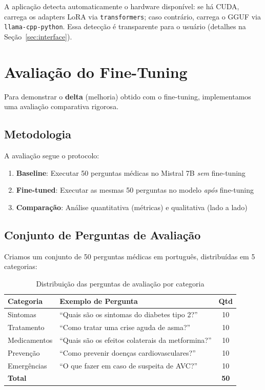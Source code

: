 A aplicação detecta automaticamente o hardware disponível: se há CUDA, carrega os adapters LoRA via \texttt{transformers}; caso contrário, carrega o GGUF via \texttt{llama-cpp-python}. Essa detecção é transparente para o usuário (detalhes na Seção~\ref{sec:interface}).

\section{Avaliação do Fine-Tuning}
\label{sec:avaliacao-ft}

Para demonstrar o \textbf{delta} (melhoria) obtido com o fine-tuning, implementamos uma avaliação comparativa rigorosa.

\subsection{Metodologia}

A avaliação segue o protocolo:

\begin{enumerate}
    \item \textbf{Baseline}: Executar 50 perguntas médicas no Mistral 7B \textit{sem} fine-tuning
    \item \textbf{Fine-tuned}: Executar as mesmas 50 perguntas no modelo \textit{após} fine-tuning
    \item \textbf{Comparação}: Análise quantitativa (métricas) e qualitativa (lado a lado)
\end{enumerate}

\subsection{Conjunto de Perguntas de Avaliação}

Criamos um conjunto de 50 perguntas médicas em português, distribuídas em 5 categorias:

\begin{table}[H]
\centering
\caption{Distribuição das perguntas de avaliação por categoria}
\label{tab:perguntas-avaliacao}
\begin{tabular}{llc}
\toprule
\textbf{Categoria} & \textbf{Exemplo de Pergunta} & \textbf{Qtd} \\
\midrule
Sintomas & ``Quais são os sintomas do diabetes tipo 2?'' & 10 \\
Tratamento & ``Como tratar uma crise aguda de asma?'' & 10 \\
Medicamentos & ``Quais são os efeitos colaterais da metformina?'' & 10 \\
Prevenção & ``Como prevenir doenças cardiovasculares?'' & 10 \\
Emergências & ``O que fazer em caso de suspeita de AVC?'' & 10 \\
\midrule
\textbf{Total} & & \textbf{50} \\
\bottomrule
\end{tabular}
\end{table}

